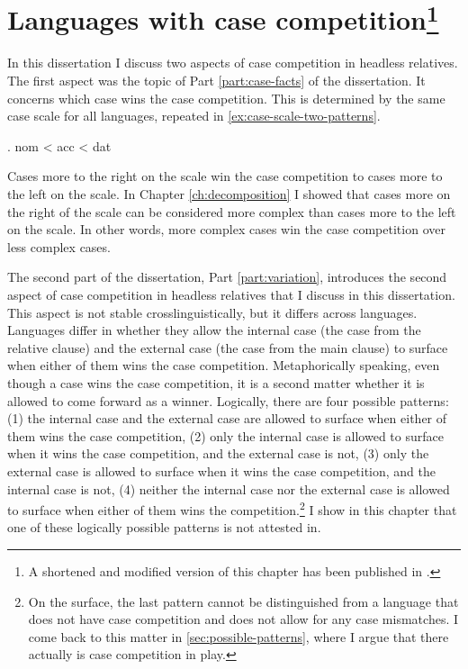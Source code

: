 
\chapter[Languages with case competition]{Languages with case competition\protect\footnote{A shortened and modified version of this chapter has been published in \citealt{bergsma2023}.}}\label{ch:typology}

In this dissertation I discuss two aspects of case competition in headless relatives. The first aspect was the topic of Part \ref{part:case-facts} of the dissertation. It concerns which case wins the case competition. This is determined by the same case scale for all languages, repeated in \ref{ex:case-scale-two-patterns}.

\ex. \ac{nom} < \ac{acc} < \ac{dat}\label{ex:case-scale-two-patterns}

Cases more to the right on the scale win the case competition to cases more to the left on the scale.
In Chapter \ref{ch:decomposition} I showed that cases more on the right of the scale can be considered more complex than cases more to the left on the scale. In other words, more complex cases win the case competition over less complex cases.

The second part of the dissertation, Part \ref{part:variation}, introduces the second aspect of case competition in headless relatives that I discuss in this dissertation. This aspect is not stable crosslinguistically, but it differs across languages. Languages differ in whether they allow the internal case (the case from the relative clause) and the external case (the case from the main clause) to surface when either of them wins the case competition. Metaphorically speaking, even though a case wins the case competition, it is a second matter whether it is allowed to come forward as a winner. Logically, there are four possible patterns: (1) the internal case and the external case are allowed to surface when either of them wins the case competition, (2) only the internal case is allowed to surface when it wins the case competition, and the external case is not, (3) only the external case is allowed to surface when it wins the case competition, and the internal case is not, (4) neither the internal case nor the external case is allowed to surface when either of them wins the competition.\footnote{
On the surface, the last pattern cannot be distinguished from a language that does not have case competition and does not allow for any case mismatches. I come back to this matter in \ref{sec:possible-patterns}, where I argue that there actually is case competition in play.
}
I show in this chapter that one of these logically possible patterns is not attested in.


